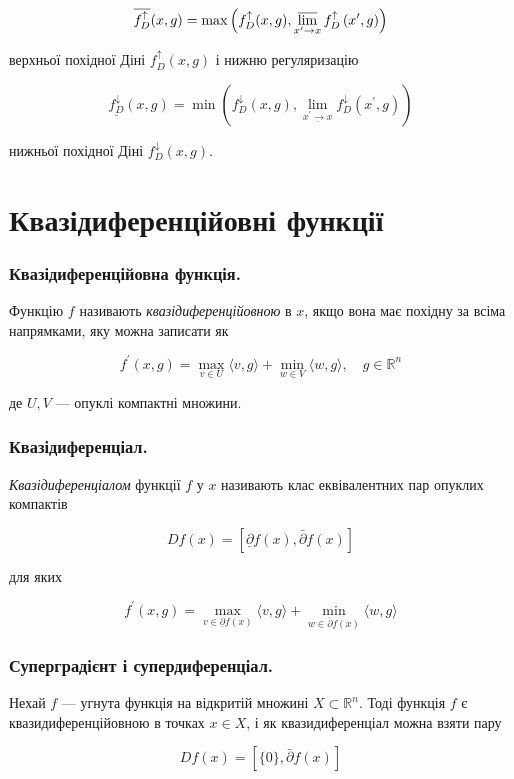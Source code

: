 \documentclass[12pt,a4paper]{extarticle}
\numberwithin{section}{part}
\begin{document}
$$
\overline{f_{D}^{\uparrow}}(x, g)=\max \left(f_{D}^{\uparrow}(x, g), \varlimsup_{x^{\prime} \rightarrow x} f_{D}^{\uparrow}\left(x^{\prime}, g\right)\right)
$$

верхньої похідної Діні $f_{D}^{\uparrow}(x, g)$ і нижню регуляризацію

$$
\underline{f_{D}^{\downarrow}}(x, g)=\min \left(f_{D}^{\downarrow}(x, g), \lim _{\underline{x^{\prime} \rightarrow x}} f_{D}^{\downarrow}\left(x^{\prime}, g\right)\right)
$$

нижньої похідної Діні $f_{D}^{\downarrow}(x, g)$.

\part{Квазідиференційовні функції}

\section{Квазідиференційовна функція.}
Функцію $f$ називають \textit{квазідиференційовною} в $x$, якщо вона має похідну за всіма напрямками, яку можна записати як

$$
f^{\prime}(x, g)=\max _{v \in U}\langle v, g\rangle+\min _{w \in V}\langle w, g\rangle, \quad g \in \mathbb{R}^{n}
$$

де $U, V$ --- опуклі компактні множини.

\section{Квазідиференціал.}
\textit{Квазідиференціалом} функції $f$ у $x$ називають клас еквівалентних пар опуклих компактів

$$
D f(x)=[\underline{\partial} f(x), \bar{\partial} f(x)]
$$

для яких

$$
f^{\prime}(x, g)=\max _{v \in \underline{\partial} f(x)}\langle v, g\rangle+\min _{w \in \bar{\partial} f(x)}\langle w, g\rangle
$$

\section{Суперградієнт і супердиференціал.}
Нехай $f$ --- угнута функція на відкритій множині $X \subset \mathbb{R}^{n}$. Тоді функція $f$ є квазидиференційовною в точках $x \in X$, і як квазидиференціал можна взяти пару

$$
D f(x)=[\{0\}, \bar{\partial} f(x)]
$$
\end{document}
